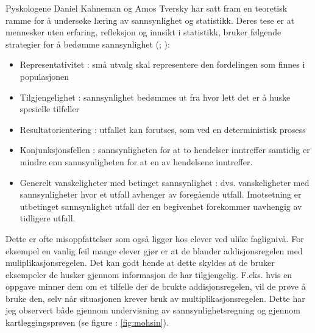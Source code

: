 \documentclass[main.tex]{subfiles}
\begin{document}
Pyskologene Daniel Kahneman og Amos Tversky har satt fram en teoretisk 
ramme for å undersøke læring av sannsynlighet og statistikk. Deres tese er at mennesker uten erfaring, refleksjon og 
innsikt i statistikk, bruker følgende strategier for å bedømme sannsynlighet (; ):
\begin{itemize}
\item Representativitet : små utvalg skal representere den fordelingen som finnes i populasjonen
\item Tilgjengelighet : sannsynlighet bedømmes ut fra hvor lett det er å huske spesielle tilfeller
\item Resultatorientering : utfallet kan forutses, som ved en deterministisk prosess
\item Konjunksjonsfellen : sannsynligheten for at to hendelser inntreffer samtidig er mindre enn sannsynligheten
for at en av hendelsene inntreffer.
\item Generelt vanskeligheter med betinget sannsynlighet : dvs. vanskeligheter med sannsynligheter hvor et utfall
avhenger av foregående utfall. Imotsetning er utbetinget sannsynlighet utfall der en begivenhet forekommer uavhengig 
av tidligere utfall. 
\end{itemize}
Dette er ofte misoppfattelser som også ligger hos elever ved ulike faglignivå. For eksempel en vanlig feil
mange elever gjør er at de blander addisjonsregelen med muliplikasjonsregelen. Det kan godt hende at dette
skyldes at de bruker eksempeler de husker gjennom informasjon de har tilgjengelig. F.eks. hvis en oppgave minner
dem om et tilfelle der de brukte addisjonsregelen, vil de prøve å bruke den, selv når situasjonen krever bruk
av multiplikasjonsregelen. Dette har jeg observert både gjennom undervisning av sannsynlighetsregning og
gjennom kartleggingsprøven (se figure : \ref{fig:mohsin}).
\newline
\end{document}
